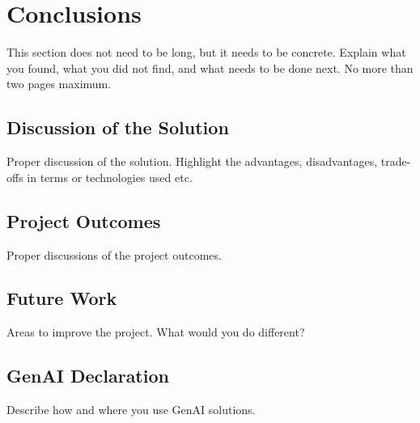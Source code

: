 \cleardoublepage%
\chapter{Conclusions}%

This section does not need to be long, but it needs to be concrete. Explain what you found, what you did not find, and what needs to be done next. No more than two pages maximum. 

\section{\label{sec:c_discussion}Discussion of the Solution}
Proper discussion of the solution. Highlight the advantages, disadvantages, trade-offs in terms or technologies used etc. 

\section{\label{sec:c_outcomes}Project Outcomes}
Proper discussions of the project outcomes. 

\section{\label{sec:c_futurew}Future Work}

Areas to improve the project. What would you do different?

\section{\label{sec:c_GenAI}GenAI Declaration}

Describe how and where you use GenAI solutions.